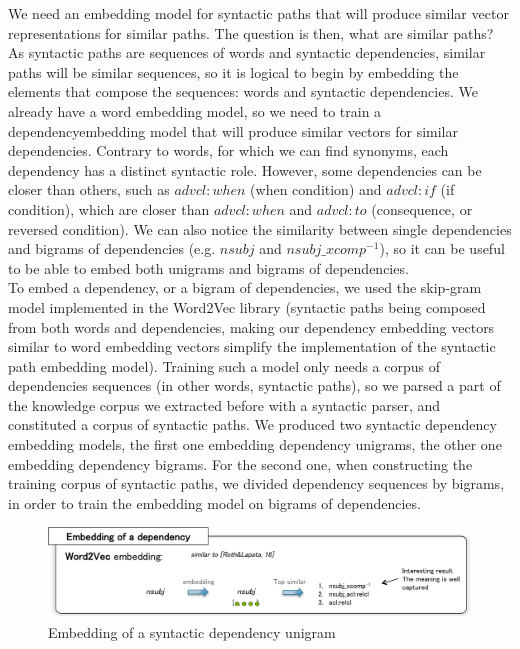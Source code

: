 \documentclass[12pt]{article}
\begin{document}
We need an embedding model for syntactic paths that will produce similar vector representations for similar paths. The question is then, what are similar paths?\\
As syntactic paths are sequences of words and syntactic dependencies, similar paths will be similar sequences, so it is logical to begin by embedding the elements that compose the sequences: words and syntactic dependencies. We already have a word embedding model, so we need to train a dependencyembedding model that will produce similar vectors for similar dependencies. 
Contrary to words, for which we can find synonyms, each dependency has a distinct syntactic role. However, some dependencies can be closer than others, such as $advcl:when$ (when condition) and $advcl:if$ (if condition), which are closer than $advcl:when$ and $advcl:to$ (consequence, or reversed condition). We can also notice the similarity between single dependencies and bigrams of dependencies (e.g. $nsubj$ and $nsubj\_xcomp^{-1}$), so it can be useful to be able to embed both unigrams and bigrams of dependencies.\\
To embed a dependency, or a bigram of dependencies, we used the skip-gram model implemented in the Word2Vec library (syntactic paths being composed from both words and dependencies, making our dependency embedding vectors similar to word embedding vectors simplify the implementation of the syntactic path embedding model). Training such a model only needs a corpus of dependencies sequences (in other words, syntactic paths), so we parsed a part of the knowledge corpus we extracted before with a syntactic parser, and constituted a corpus of syntactic paths. We produced two syntactic dependency embedding models, the first one embedding dependency unigrams, the other one embedding dependency bigrams. For the second one, when constructing the training corpus of syntactic paths, we divided dependency sequences by bigrams, in order to train the embedding model on bigrams of dependencies.

\begin{figure}[!ht]
   \centering \includegraphics[width=\linewidth]{Figures/Semantic_Parsing/dependencyEmbedding.png}
   \caption{\label{dependencyEmbedding} Embedding of a syntactic dependency unigram}
\end{figure}
\end{document}
